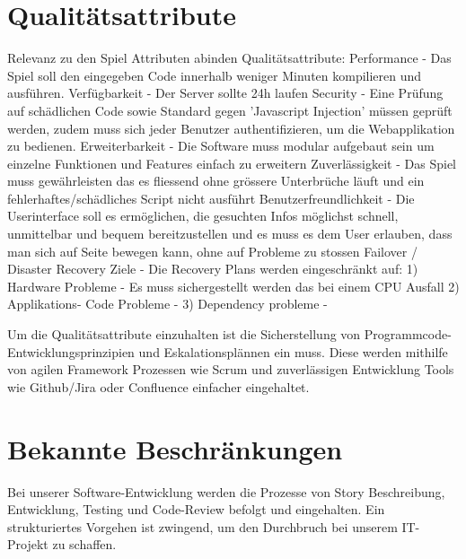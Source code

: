 \documentclass[a4paper, 11pt]{scrartcl}
\let\oldsection\section
\renewcommand\section{\clearpage\oldsection}
\begin{document}
\section{Qualitätsattribute}

Relevanz zu den Spiel Attributen abinden
Qualitätsattribute:
Performance - Das Spiel soll den eingegeben Code innerhalb weniger Minuten kompilieren und ausführen.
Verfügbarkeit - Der Server sollte 24h laufen
Security - Eine Prüfung auf schädlichen Code sowie Standard gegen 'Javascript Injection' müssen geprüft werden, zudem muss sich jeder Benutzer authentifizieren, um die Webapplikation zu bedienen.
Erweiterbarkeit - Die Software muss modular aufgebaut sein um einzelne Funktionen und Features einfach zu erweitern
Zuverlässigkeit - Das Spiel muss gewährleisten das es fliessend ohne grössere Unterbrüche läuft und ein fehlerhaftes/schädliches Script nicht ausführt
Benutzerfreundlichkeit - Die Userinterface soll es ermöglichen, die gesuchten Infos möglichst schnell, unmittelbar und bequem bereitzustellen und es muss es dem User erlauben, dass man sich auf Seite bewegen kann, ohne auf Probleme zu stossen
Failover / Disaster Recovery Ziele - Die Recovery Plans werden eingeschränkt auf:
1) Hardware Probleme - Es muss sichergestellt werden das bei einem CPU Ausfall
2) Applikations- Code Probleme -
3) Dependency probleme -

Um die Qualitätsattribute einzuhalten ist die Sicherstellung von Programmcode-Entwicklungsprinzipien und Eskalationsplännen ein muss. Diese werden mithilfe
von agilen Framework Prozessen wie Scrum und zuverlässigen Entwicklung Tools wie Github/Jira oder Confluence einfacher eingehaltet.

\section{Bekannte Beschränkungen}

Bei unserer Software-Entwicklung werden die Prozesse von Story Beschreibung, Entwicklung, Testing und Code-Review befolgt und eingehalten.
Ein strukturiertes Vorgehen ist zwingend, um den Durchbruch bei unserem IT-Projekt zu schaffen.
\end{document}
